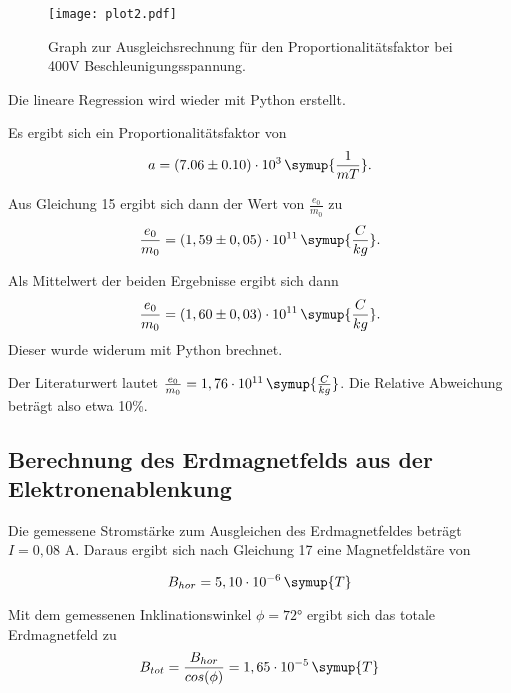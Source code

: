 \begin{figure}[H]
  \centering
  \texttt{[image: plot2.pdf]}
  \caption{Graph zur Ausgleichsrechnung für den Proportionalitätsfaktor bei 400V Beschleunigungsspannung.}
  \label{fig:plot222}
\end{figure}

Die lineare Regression wird wieder mit Python erstellt.

Es ergibt sich ein Proportionalitätsfaktor von
\begin{equation*}
  a = (7.06 \pm 0.10)\cdot 10^3\, \symup{\frac{1}{mT}}.
\end{equation*}

Aus Gleichung 15 ergibt sich dann der Wert von $\frac{e_0}{m_0}$ zu
\begin{equation*}
  \frac{e_0}{m_0} = (1,59 \pm 0,05)\cdot 10^{11} \, \symup{\frac{C}{kg}}.
\end{equation*}

Als Mittelwert der beiden Ergebnisse ergibt sich dann
\begin{equation*}
  \frac{e_0}{m_0} = (1,60 \pm 0,03)\cdot 10^{11} \, \symup{\frac{C}{kg}}.
\end{equation*}
Dieser wurde widerum mit Python brechnet.

Der Literaturwert lautet $\frac{e_0}{m_0} = 1,76 \cdot 10^{11} \, \symup{\frac{C}{kg}}$.
Die Relative Abweichung beträgt also etwa 10\%.

\subsection{Berechnung des Erdmagnetfelds aus der Elektronenablenkung}

Die gemessene Stromstärke zum Ausgleichen des Erdmagnetfeldes beträgt $I = 0,08$ A.
Daraus ergibt sich nach Gleichung 17 eine Magnetfeldstäre von

\begin{equation*}
  B_{hor} = 5,10 \cdot 10^{-6} \, \symup{T}
\end{equation*}

Mit dem gemessenen Inklinationswinkel $\phi = 72°$ ergibt sich das totale
Erdmagnetfeld zu
\begin{equation*}
  B_{tot} = \frac{B_{hor}}{cos(\phi)} = 1,65 \cdot 10^{-5} \, \symup{T}
\end{equation*}
